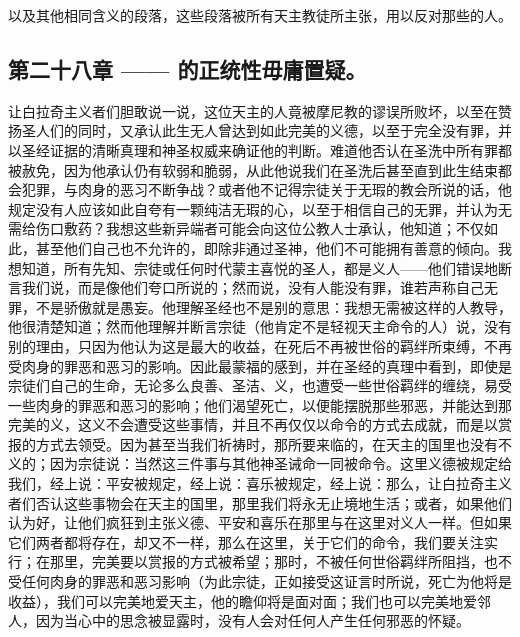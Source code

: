  以及其他相同含义的段落，这些段落被所有天主教徒所主张，用以反对那些的人。\par


\subsection{第二十八章 —— 的正统性毋庸置疑。}

让白拉奇主义者们胆敢说一说，这位天主的人竟被摩尼教的谬误所败坏，以至在赞扬圣人们的同时，又承认此生无人曾达到如此完美的义德，以至于完全没有罪，并以圣经证据的清晰真理和神圣权威来确证他的判断。难道他否认在圣洗中所有罪都被赦免，因为他承认仍有软弱和脆弱，从此他说我们在圣洗后甚至直到此生结束都会犯罪，与肉身的恶习不断争战？或者他不记得宗徒关于无瑕的教会所说的话，他规定没有人应该如此自夸有一颗纯洁无瑕的心，以至于相信自己的无罪，并认为无需给伤口敷药？我想这些新异端者可能会向这位公教人士承认，他知道；不仅如此，甚至他们自己也不允许的，即除非通过圣神，他们不可能拥有善意的倾向。我想知道，所有先知、宗徒或任何时代蒙主喜悦的圣人，都是义人——他们错误地断言我们说，而是像他们夸口所说的；然而说，没有人能没有罪，谁若声称自己无罪，不是骄傲就是愚妄。他理解圣经也不是别的意思：我想无需被这样的人教导，他很清楚知道；然而他理解并断言宗徒（他肯定不是轻视天主命令的人）说，没有别的理由，只因为他认为这是最大的收益，在死后不再被世俗的羁绊所束缚，不再受肉身的罪恶和恶习的影响。因此最蒙福的感到，并在圣经的真理中看到，即使是宗徒们自己的生命，无论多么良善、圣洁、义，也遭受一些世俗羁绊的缠绕，易受一些肉身的罪恶和恶习的影响；他们渴望死亡，以便能摆脱那些邪恶，并能达到那完美的义，这义不会遭受这些事情，并且不再仅仅以命令的方式去成就，而是以赏报的方式去领受。因为甚至当我们祈祷时，那所要来临的，在天主的国里也没有不义的；因为宗徒说：当然这三件事与其他神圣诫命一同被命令。这里义德被规定给我们，经上说：平安被规定，经上说：喜乐被规定，经上说：那么，让白拉奇主义者们否认这些事物会在天主的国里，那里我们将永无止境地生活；或者，如果他们认为好，让他们疯狂到主张义德、平安和喜乐在那里与在这里对义人一样。但如果它们两者都将存在，却又不一样，那么在这里，关于它们的命令，我们要关注实行；在那里，完美要以赏报的方式被希望；那时，不被任何世俗羁绊所阻挡，也不受任何肉身的罪恶和恶习影响（为此宗徒，正如接受这证言时所说，死亡为他将是收益），我们可以完美地爱天主，他的瞻仰将是面对面；我们也可以完美地爱邻人，因为当心中的思念被显露时，没有人会对任何人产生任何邪恶的怀疑。\par

